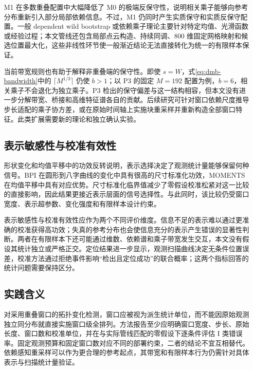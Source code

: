 M1 在多数重叠配置中大幅降低了 M0 的极端反保守性，说明相关乘子能够向参考分布重新引入部分局部依赖信息。不过，M1 仍同时产生实质保守和实质反保守配置。一般 dependent wild bootstrap 或依赖乘子理论主要针对特定均值、光滑函数或经验过程\cite{Shao2010,BucherKojadinovic2016}；本文管线还包含局部点云构造、持续同调、800 维固定网格映射和候选位置最大化，这些非线性环节使一般渐近结论无法直接转化为统一的有限样本保证。

当前带宽规则也有助于解释非重叠端的保守性。即使 $s=W$，式\eqref{eq:dmb-bandwidth}中的 $\lceil M^{1/3}\rceil$ 仍使 $b>1$；以 P3 的固定 $M=192$ 配置为例，$b=6$，相关乘子不会退化为独立乘子。P3 检出的保守偏差与这一结构相容，但本文没有进一步分解带宽、桥接和高维特征谱各自的贡献。后续研究可针对窗口依赖尺度推导步长适配的乘子协方差，或在原始时间轴上实施块重采样并重新构造全部窗口特征。此类扩展需要新的理论和独立确认实验。

\subsection{表示敏感性与校准有效性}\label{sec:disc-representation}

形状变化和均值平移中的功效反转说明，表示选择决定了观测统计量能够保留何种信号。BPI 在圆形到八字曲线的变化中具有很高的尺寸标准化功效，MOMENTS 在均值平移中具有对应优势。尺寸标准化临界值减少了零假设校准松紧对这一比较的直接影响，因此结果更接近表示层面的信号选择性。与此同时，该比较仍受窗口宽度、表示超参数、变化强度和有限样本设计约束。

表示敏感性与校准有效性应作为两个不同评价维度。信息不足的表示难以通过更准确的校准获得高功效；失真的参考分布也会使信息充分的表示产生错误的显著性判断。两者在有限样本下还可能通过维数、依赖谱和乘子带宽发生交互，本文没有假设其统计独立或严格正交。定位结果进一步显示，观测扫描曲线决定无条件位置误差，校准方法通过拒绝事件影响“检出且定位成功”的联合概率；这两个指标回答的统计问题需要保持区分。

\subsection{实践含义}\label{sec:disc-practice}

对采用重叠窗口的拓扑变化检测，窗口应被视为派生统计单位，而不能因原始观测独立同分布就直接实施窗口级全排列。方法报告至少应明确窗口宽度、步长、原始长度、窗口数和校准单位，并在与实际管线匹配的零假设下逐条件评估 I 类错误率。固定观测预算和固定窗口数对应不同的部署约束，二者的结论不宜互相替代。依赖感知重采样可以作为更合理的参考起点，其带宽和有限样本行为仍需针对具体表示与扫描统计量验证。

